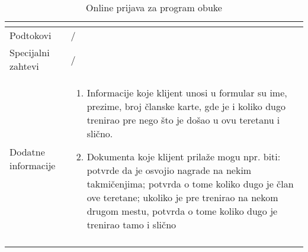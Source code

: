 \documentclass[../../main.tex]{subfiles}
\begin{document}
\begin{longtable}{| p{} | p{} |}
\begin{itemize}
    \end{itemize} \\
\hline
    Podtokovi & /\\
\hline
    Specijalni zahtevi & /\\
\hline
    Dodatne informacije &
    \begin{enumerate}
        \item Informacije koje klijent unosi u formular su ime, prezime, broj članske karte, gde je i koliko dugo trenirao pre nego što je došao u ovu teretanu i slično.
        \item Dokumenta koje klijent prilaže mogu npr. biti: potvrde da je osvojio nagrade na nekim takmičenjima; potvrda o tome koliko dugo je član ove teretane; ukoliko je pre trenirao na nekom drugom mestu, potvrda o tome koliko dugo je trenirao tamo i slično
    \end{enumerate}\\
\hline
\caption{Online prijava za program obuke}
\end{longtable}
\end{document}
